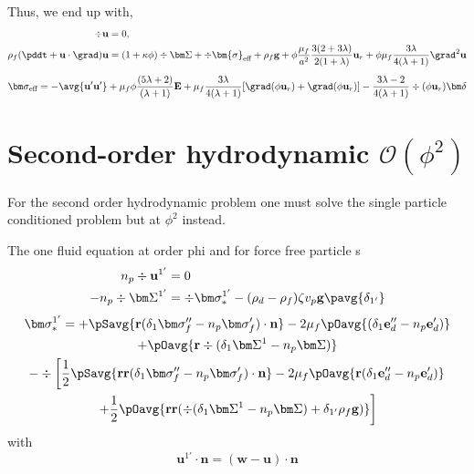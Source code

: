 Thus, we end up with, 
\begin{align}
    \div\textbf{u}&=0, \\
    \rho_f (\pddt 
    + \textbf{u}\cdot \grad)
    \textbf{u}
    &= 
    (1+\kappa \phi) \div \bm\Sigma
    +\div \bm{\sigma}_\text{eff} 
    + \rho_f \textbf{g} 
    +\phi \frac{\mu_f}{a^2} \frac{3(2+3\lambda)}{2(1+\lambda)}\textbf{u}_r
    + \phi\mu_f  \frac{3\lambda}{4(\lambda +1)} \grad^2 \textbf{u}
\end{align}
\begin{align*}
    \bm\sigma_\text{eff}  = 
    - \avg{ \textbf{u}'\textbf{u}'}
    + \mu_f \phi  \frac{(5\lambda +2)}{(\lambda +1)}\textbf{E} 
    + \mu_f \frac{3\lambda}{4(\lambda +1)}[\grad (\phi \textbf{u}_r)+\grad (\phi\textbf{u}_r)] 
    - \frac{3\lambda-2}{4(\lambda+1)}\div (\phi\textbf{u}_r) \bm\delta 
\end{align*}
\section{Second-order hydrodynamic $\mathcal{O}( \phi^2)$}

For the second order hydrodynamic problem one must solve the single particle conditioned problem but at $\phi^2$ instead.

The  one fluid equation at order phi and for force free particle s
\begin{align*}
    n_p \div \textbf{u}^{1'} &= 0\\
    -n_p\div\bm\Sigma^{1'} 
    &= 
   \div \bm\sigma_*^{1'}
   - (\rho_d-\rho_f)\zeta v_p\textbf{g}  \pavg{\delta_{1'}}
\end{align*}
\begin{multline}
    \bm\sigma_*^{1'}  = 
    + \pSavg{\textbf{r}(\delta_1\bm\sigma_f'' - n_p \bm\sigma_f') \cdot \textbf{n}}
    -2\mu_f  \pOavg{ (\delta_1 \textbf{e}_d''- n_p \textbf{e}_d')}\\
    +  \pOavg{\textbf{r}\div (\delta_1 \bm\Sigma^1-n_p \bm\Sigma)}
    \\
    - \div \left[
        \frac{1}{2}
        \pSavg{\textbf{rr}(\delta_1\bm\sigma_f'' - n_p \bm\sigma_f') \cdot \textbf{n}}
        -2\mu_f \pOavg{\textbf{r}(\delta_1 \textbf{e}_d''- n_p \textbf{e}_d')} \right.\\ \left.
        + \frac{1}{2}\pOavg{\textbf{rr}(\div(\delta_1 \bm\Sigma^1-n_p \bm\Sigma) + \delta_{1'} \rho_f \textbf{g})} 
    \right] 
\end{multline}
with 
\begin{equation}
    \textbf{u}^{1'}\cdot \textbf{n} =
     (\textbf{w} - \textbf{u})\cdot \textbf{n}
\end{equation}

